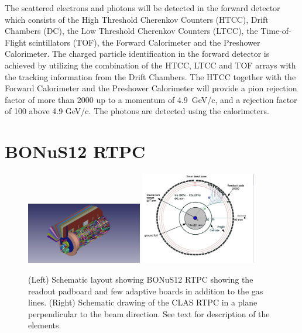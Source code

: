 The scattered electrons and photons will be detected in the forward detector which consists 
of the High Threshold Cherenkov Counters (HTCC), Drift Chambers (DC), the Low 
Threshold Cherenkov Counters (LTCC), the Time-of-Flight scintillators (TOF), 
the Forward Calorimeter and the Preshower Calorimeter. The charged particle 
identification in the forward detector is achieved by utilizing the combination 
of the HTCC, LTCC and TOF arrays with the tracking information from the Drift 
Chambers. The HTCC together with the Forward Calorimeter and the Preshower 
Calorimeter will provide a pion rejection factor of more than 2000 up to a 
momentum of 4.9~GeV/c, and a rejection factor of 100 above 4.9 GeV/c. The photons
are detected using the calorimeters.

\section{BONuS12 RTPC} 

\begin{figure}
  \begin{center}
    \includegraphics[angle=0, width=0.45\textwidth, clip,trim=50mm 10mm 80mm 
     0mm]{figures/Bonus12_cad.png}
    \includegraphics[angle=0, width=0.45\textwidth,clip,trim=0mm 10mm 20mm 0mm 
     ]{figures/NKsBXp.png}
     \caption{(Left) Schematic layout showing BONuS12 RTPC showing the readout 
     padboard and few adaptive boards in addition to the gas lines. (Right) 
     Schematic drawing of the CLAS RTPC in a plane perpendicular to the beam 
     direction. See text for description of the elements.}
    \label{fig:bonus12}
  \end{center}
\end{figure}

